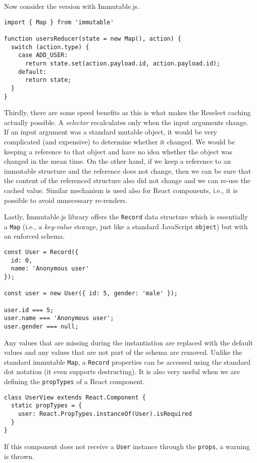 Now consider the version with Immutable.js.

\begin{verbatim}
import { Map } from 'immutable'

function usersReducer(state = new Map(), action) {
  switch (action.type) {
    case ADD_USER: 
      return state.set(action.payload.id, action.payload.id);
    default:
      return state;
  }
}
\end{verbatim}

Thirdly, there are some speed benefits as this is what makes the Reselect caching actually possible. A \emph{selector} recalculates only when the input arguments change. If an input argument was a standard mutable object, it would be very complicated (and expensive) to determine whether it changed. We would be keeping a reference to that object and have no idea whether the object was changed in the mean time. On the other hand, if we keep a reference to an immutable structure and the reference does not change, then we can be sure that the content of the referenced structure also did not change and we can re-use the cached value. Similar mechanism is used also for React components, i.e., it is possible to avoid unnecessary re-renders.

Lastly, Immutable.js library offers the \texttt{Record} data structure which is essentially a \texttt{Map} (i.e., a \emph{key-value} storage, just like a standard JavaScript \texttt{object}) but with an enforced schema.

\begin{verbatim}
const User = Record({
  id: 0,
  name: 'Anonymous user'
});

const user = new User({ id: 5, gender: 'male' });

user.id === 5;
user.name === 'Anonymous user';
user.gender === null;
\end{verbatim}

Any values that are missing during the instantiation are replaced with the default values and any values that are not part of the schema are removed. Unlike the standard immutable \texttt{Map}, a \texttt{Record} properties can be accessed using the standard dot notation (it even supports destructing). It is also very useful when we are defining the \texttt{propTypes} of a React component.

\begin{verbatim}
class UserView extends React.Component {
  static propTypes = {
    user: React.PropTypes.instanceOf(User).isRequired
  }
}
\end{verbatim}

If this component does not receive a \texttt{User} instance through the \texttt{props}, a warning is thrown.